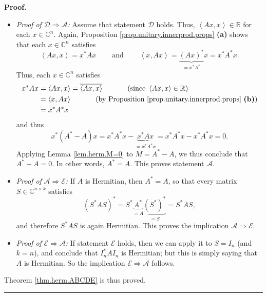 \documentclass[numbers=enddot,12pt,final,onecolumn,notitlepage]{scrartcl}%
\numberwithin{exer}{subsection}
\theoremstyle{definition}
\newenvironment{proof}[1][Proof]{\noindent\textbf{#1.} }{\ \rule{0.5em}{0.5em}}
\begin{document}
\begin{proof}
\begin{itemize}
\item \textit{Proof of }$\mathcal{D}\Longrightarrow\mathcal{A}$\textit{:}
Assume that statement $\mathcal{D}$ holds. Thus, $\left\langle
Ax,x\right\rangle \in\mathbb{R}$ for each $x\in\mathbb{C}^{n}$. Again,
Proposition \ref{prop.unitary.innerprod.props} \textbf{(a)} shows that each
$x\in\mathbb{C}^{n}$ satisfies%
\[
\left\langle Ax,x\right\rangle =x^{\ast}Ax\ \ \ \ \ \ \ \ \ \ \text{and}%
\ \ \ \ \ \ \ \ \ \ \left\langle x,Ax\right\rangle =\underbrace{\left(
Ax\right)  ^{\ast}}_{=x^{\ast}A^{\ast}}x=x^{\ast}A^{\ast}x.
\]
Thus, each $x\in\mathbb{C}^{n}$ satisfies%
\begin{align*}
x^{\ast}Ax  &  =\left\langle Ax,x\right\rangle =\overline{\left\langle
Ax,x\right\rangle }\ \ \ \ \ \ \ \ \ \ \left(  \text{since }\left\langle
Ax,x\right\rangle \in\mathbb{R}\right) \\
&  =\left\langle x,Ax\right\rangle \ \ \ \ \ \ \ \ \ \ \left(  \text{by
Proposition \ref{prop.unitary.innerprod.props} \textbf{(b)}}\right) \\
&  =x^{\ast}A^{\ast}x
\end{align*}
and thus%
\[
x^{\ast}\left(  A^{\ast}-A\right)  x=x^{\ast}A^{\ast}x-\underbrace{x^{\ast}%
Ax}_{=x^{\ast}A^{\ast}x}=x^{\ast}A^{\ast}x-x^{\ast}A^{\ast}x=0.
\]
Applying Lemma \ref{lem.herm.M=0} to $M=A^{\ast}-A$, we thus conclude that
$A^{\ast}-A=0$. In other words, $A^{\ast}=A$. This proves statement
$\mathcal{A}$.

\item \textit{Proof of }$\mathcal{A}\Longrightarrow\mathcal{E}$\textit{:} If
$A$ is Hermitian, then $A^{\ast}=A$, so that every matrix $S\in\mathbb{C}%
^{n\times k}$ satisfies%
\[
\left(  S^{\ast}AS\right)  ^{\ast}=S^{\ast}\underbrace{A^{\ast}}%
_{=A}\underbrace{\left(  S^{\ast}\right)  ^{\ast}}_{=S}=S^{\ast}AS,
\]
and therefore $S^{\ast}AS$ is again Hermitian. This proves the implication
$\mathcal{A}\Longrightarrow\mathcal{E}$.

\item \textit{Proof of }$\mathcal{E}\Longrightarrow\mathcal{A}$\textit{:} If
statement $\mathcal{E}$ holds, then we can apply it to $S=I_{n}$ (and $k=n$),
and conclude that $I_{n}^{\ast}AI_{n}$ is Hermitian; but this is simply saying
that $A$ is Hermitian. So the implication $\mathcal{E}\Longrightarrow
\mathcal{A}$ follows.
\end{itemize}

Theorem \ref{thm.herm.ABCDE} is thus proved.
\end{proof}
\end{document}
